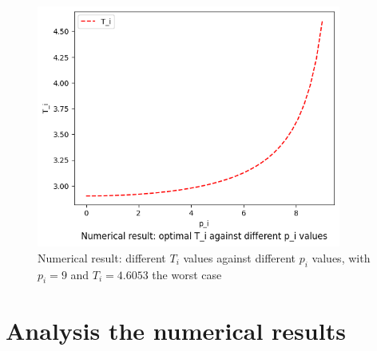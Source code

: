 \documentclass  [
  paper    = a4,
  BCOR     = 10mm,
  twoside,
  fontsize = 12pt,
  fleqn,
  toc      = bibnumbered,
  toc      = listofnumbered,
  numbers  = noendperiod,
  headings = normal,
  listof   = leveldown,
  version  = 3.03
]                                       {scrreprt}
\newcommand{\<}{\langle}
\renewcommand{\>}{\rangle}
\begin{document}
\begin{figure}[h]
	\centerline{\includegraphics[width=10cm]{numerical_T_p.png}}
	\caption{Numerical result: different $T_i$ values against different $p_i$ values, with $p_i=9$ and  $T_i=4.6053$ the worst case}
	\label{fig_ta_numerical_T_p}
\end{figure}


\section{Analysis the numerical results}
\label{Sec_NR}








\end{document}
